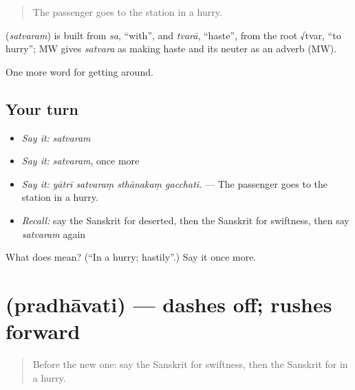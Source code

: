 \begin{quote}
The passenger goes to the station in a hurry.
\end{quote}

\begin{cousinweb}
\textbf{} (\emph{satvaram}) is built from \emph{sa}, \textquotedblleft{}with\textquotedblright{}, and \emph{tvarā}, \textquotedblleft{}haste\textquotedblright{}, from the root √tvar, \textquotedblleft{}to hurry\textquotedblright{}; MW gives \emph{satvara} as making haste and its neuter as an adverb (MW).
\end{cousinweb}

\begin{grammarlens}[title={What you've built}]
One more word for getting around.
\end{grammarlens}

\subsection*{Your turn}
\begin{itemize}
\raggedright
  \item \emph{Say it:} \emph{satvaram}
  \item \emph{Say it:} \emph{satvaram}, once more
  \item \emph{Say it:} \emph{yātrī satvaraṃ sthānakaṃ gacchati.} — The passenger goes to the station in a hurry.
  \item \emph{Recall:} say the Sanskrit for deserted, then the Sanskrit for swiftness, then say \emph{satvaram} again
\end{itemize}

\begin{tcolorbox}[breakable,colback=teal!4,colframe=teal!35!black,title={Before you move on}]
What does  mean? (\textquotedblleft{}In a hurry; hastily\textquotedblright{}.) Say it once more.
\end{tcolorbox}
\section[\texorpdfstring{\sk{प्रधावति} (pradhāvati)}{प्रधावति (pradhāvati)}]{ (pradhāvati) — dashes off; rushes forward}

\label{lesson:SA-C405-pradhavati}



\begin{quote}
Before the new one: say the Sanskrit for swiftness, then the Sanskrit for in a hurry.
\end{quote}

